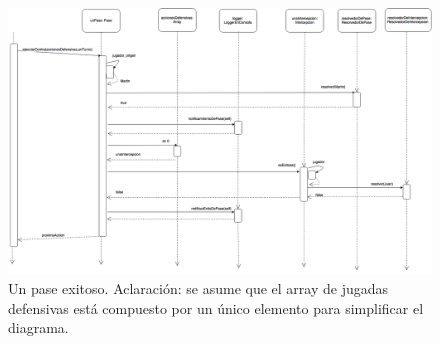  
\begin{landscape}

  \begin{figure}[h!]
   \includegraphics[scale=0.35]{imagenes/pase-exitoso.png}
   \caption{Un pase exitoso. Aclaración: se asume que el array de jugadas defensivas está compuesto por un único elemento para simplificar el diagrama.}
  \end{figure}

\end{landscape}

